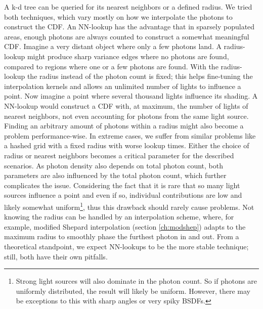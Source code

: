 A k-d tree can be queried for its nearest neighbors or a defined radius. We tried both techniques, which vary mostly on how we interpolate the photons to construct the CDF. An NN-lookup has the advantage that in sparsely populated areas, enough photons are always counted to construct a somewhat meaningful CDF. Imagine a very distant object where only a few photons land. A radius-lookup might produce sharp variance edges where no photons are found, compared to regions where one or a few photons are found. With the radius-lookup the radius instead of the photon count is fixed; this helps fine-tuning the interpolation kernels and allows an unlimited number of lights to influence a point. Now imagine a point where several thousand lights influence its shading. A NN-lookup would construct a CDF with, at maximum, the number of lights of nearest neighbors, not even accounting for photons from the same light source. Finding an arbitrary amount of photons within a radius might also become a problem performance-wise. In extreme cases, we suffer from similar problems like a hashed grid with a fixed radius with worse lookup times. Either the choice of radius or nearest neighbors becomes a critical parameter for the described scenarios. As photon density also depends on total photon count, both parameters are also influenced by the total photon count, which further complicates the issue. Considering the fact that it is rare that so many light sources influence a point and even if so, individual contributions are low and likely somewhat uniform\footnote{Strong light sources will also dominate in the photon count. So if photons are uniformly distributed, the result will likely be uniform. However, there may be exceptions to this with sharp angles or very spiky BSDFs.}, thus this drawback should rarely cause problems. Not knowing the radius can be handled by an interpolation scheme, where, for example, modified Shepard interpolation (section \ref{ch:modshep}) adapts to the maximum radius to smoothly phase the furthest photon in and out. From a theoretical standpoint, we expect NN-lookups to be the more stable technique; still, both have their own pitfalls. 

